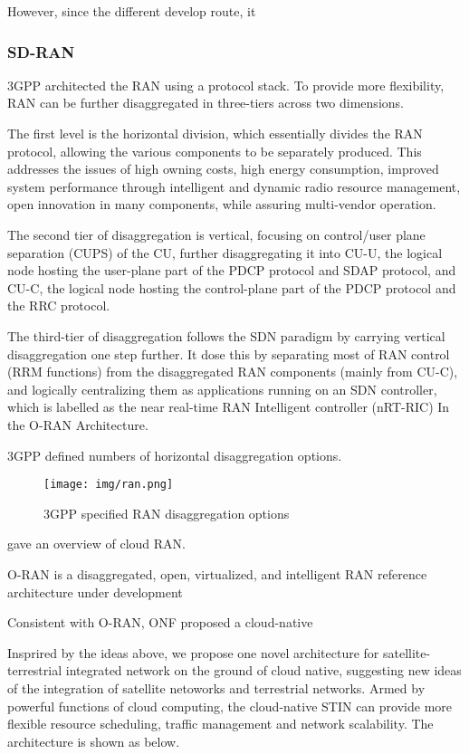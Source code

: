 \documentclass[12pt, draftclsnofoot, onecolumn]{IEEEtran}
\begin{document}
However, since the different develop route, it 
\subsubsection{SD-RAN}


3GPP architected the RAN using a protocol stack. To provide more flexibility, RAN can be further disaggregated in three-tiers across two dimensions. 

The first level is the horizontal division, which essentially divides the RAN protocol, allowing the various components to be separately produced. This addresses the issues of high owning costs, high energy consumption, improved system performance through intelligent and dynamic radio resource management, open innovation in many components, while assuring multi-vendor operation.

The second tier of disaggregation is vertical, focusing on control/user plane separation (CUPS) of the CU, further disaggregating it into CU-U, the logical node hosting the user-plane part of the PDCP protocol and SDAP protocol, and CU-C, the logical node hosting the control-plane part of the PDCP protocol and the RRC protocol.

The third-tier of disaggregation follows the SDN paradigm by carrying vertical disaggregation one step further. It dose this by separating most of RAN control (RRM functions) from the disaggregated RAN components (mainly from CU-C), and logically centralizing them as applications running on an SDN controller, which is labelled as the near real-time RAN Intelligent controller (nRT-RIC) In the O-RAN Architecture.

3GPP defined numbers of horizontal disaggregation options. 
\begin{figure}
	\texttt{[image: img/ran.png]}
	\caption{3GPP specified RAN disaggregation options}
\end{figure}

\cite{checko2014cloud} gave an overview of cloud RAN.

O-RAN\cite{oran} is a disaggregated, open, virtualized, and intelligent RAN reference architecture under development


Consistent with O-RAN, ONF proposed a cloud-native  \cite{sunay2020onf}










Insprired by the ideas above, we propose one novel architecture for satellite-terrestrial integrated network on the ground of cloud native, suggesting new ideas of the integration of satellite netoworks and terrestrial networks. Armed by powerful functions of cloud computing, the cloud-native STIN can provide more flexible resource scheduling, traffic management and network scalability. The architecture is shown as below.
\end{document}
